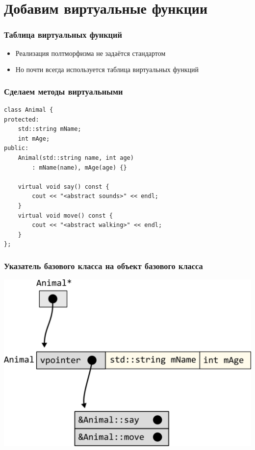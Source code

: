 \documentclass[10pt,pdf,hyperref={unicode}]{beamer}
\begin{document}
\section{Добавим виртуальные функции}

\begin{frame}[fragile]
\frametitle{Таблица виртуальных функций}
\begin{itemize}
\item Реализация полтморфизма не задаётся стандартом
\item Но почти всегда используется таблица виртуальных функций
\end{itemize}
\end{frame}

\begin{frame}[fragile]
\frametitle{Сделаем методы виртуальными}
\begin{lstlisting}
class Animal {
protected:
    std::string mName;
    int mAge;
public:
    Animal(std::string name, int age) 
    	: mName(name), mAge(age) {}

    virtual void say() const {
        cout << "<abstract sounds>" << endl;
    }
    virtual void move() const {
        cout << "<abstract walking>" << endl;
    }
};
\end{lstlisting}
\end{frame}

\begin{frame}[fragile]
\frametitle{Указатель базового класса на объект базового класса}
\begin{center}
\includegraphics[width=0.8\linewidth]{../images/virtual_animal_pointer_to_animal.png}
\end{center}
\end{frame}
\end{document}
